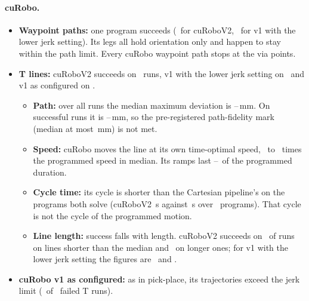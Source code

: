 \documentclass[11pt]{article}
\begin{document}
\paragraph{cuRobo.}
\begin{itemize}
  \item \textbf{Waypoint paths:} one program succeeds (\ttWVTwo\ for cuRoboV2, \ttWJ\ for v1 with the lower jerk setting). Its legs all hold orientation only and happen to stay within the path limit. Every cuRobo waypoint path stops at the via points.
  \item \textbf{T lines:} cuRoboV2 succeeds on \ttTVTwo\ runs, v1 with the lower jerk setting on \ttTJ\ and v1 as configured on \ttTVOne.
  \begin{itemize}
    \item \textbf{Path:} over all runs the median maximum deviation is \ttCuroboDevMin--\ttCuroboDevMax\,mm. On successful runs it is \ttCuroboDevSuccMin--\ttCuroboDevSuccMax\,mm, so the pre-registered path-fidelity mark (median at most \ttEndMm\,mm) is not met.
    \item \textbf{Speed:} cuRobo moves the line at its own time-optimal speed, \ttCuroboSpeedMin\ to \ttCuroboSpeedMax\ times the programmed speed in median. Its ramps last \ttCuroboRampMin--\ttCuroboRampMax\ of the programmed duration.
    \item \textbf{Cycle time:} its cycle is shorter than the Cartesian pipeline's on the programs both solve (cuRoboV2 \ttPairTwo\,s against \ttPairTwoCart\,s over \ttPairTwoN\ programs). That cycle is not the cycle of the programmed motion.
    \item \textbf{Line length:} success falls with length. cuRoboV2 succeeds on \ttLenTwoShort\ of runs on lines shorter than the median and \ttLenTwoLong\ on longer ones; for v1 with the lower jerk setting the figures are \ttLenJShort\ and \ttLenJLong.
  \end{itemize}
  \item \textbf{cuRobo v1 as configured:} as in pick-place, its trajectories exceed the jerk limit (\ttVOneTJerkFail\ of \ttVOneTFail\ failed T runs).
\end{itemize}
\end{document}
